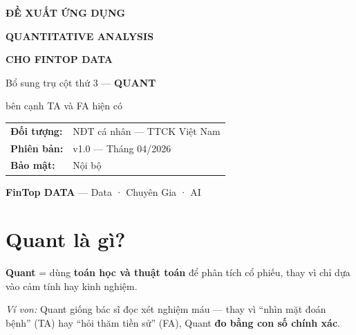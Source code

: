 \documentclass[12pt,a4paper]{article}
\begin{document}
\begin{titlepage}
\centering
\vspace*{3cm}

{\Huge\bfseries\textcolor{purple-core}{ĐỀ XUẤT ỨNG DỤNG}\par}
\vspace{0.5cm}
{\Huge\bfseries\textcolor{purple-core}{QUANTITATIVE ANALYSIS}\par}
\vspace{0.3cm}
{\Huge\bfseries\textcolor{gold-primary}{CHO FINTOP DATA}\par}

\vspace{2cm}

{\Large Bổ sung trụ cột thứ 3 — \textbf{QUANT}}\\[0.3cm]
{\Large bên cạnh TA và FA hiện có\par}

\vspace{2cm}

\begin{tabular}{ll}
\textbf{Đối tượng:} & NĐT cá nhân — TTCK Việt Nam \\
\textbf{Phiên bản:} & v1.0 — Tháng 04/2026 \\
\textbf{Bảo mật:} & Nội bộ \\
\end{tabular}

\vfill
{\large\textcolor{purple-core}{\textbf{FinTop DATA}} — Data · Chuyên Gia · AI\par}
\end{titlepage}

\tableofcontents
\newpage

\section{Quant là gì?}

\begin{infobox}
\textbf{Quant} = dùng \textbf{toán học và thuật toán} để phân tích cổ phiếu, thay vì chỉ dựa vào cảm tính hay kinh nghiệm.

\textit{Ví von:} Quant giống bác sĩ đọc xét nghiệm máu — thay vì ``nhìn mặt đoán bệnh'' (TA) hay ``hỏi thăm tiền sử'' (FA), Quant \textbf{đo bằng con số chính xác}.
\end{infobox}
\end{document}
